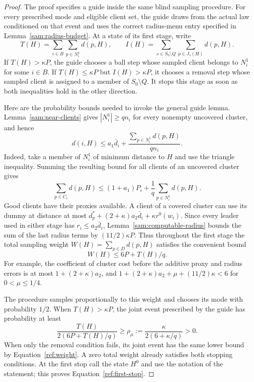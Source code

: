 \begin{proof}
The proof specifies a guide inside the same blind sampling procedure.
For every prescribed mode and eligible client set, the guide draws from
the actual law conditioned on that event and uses the correct radius-menu
entry specified in Lemma~\ref{sam:radius-budget}.
At a state of its first stage, write
\[
 T(H)=\sum_{i\in B}\sum_{p\in N_i^1}d(p,H),\qquad
 I(H)=\sum_{s\in S_0\setminus Q}\sum_{p\in J_s(H)}d(p,H).
\]
If $T(H)>\kappa P$, the guide chooses a ball step whose sampled client belongs
to $N_i^1$ for some $i\in B$.  If $T(H)\le\kappa P$ but
$I(H)>\kappa P$, it chooses a removal step whose sampled client is assigned
to a member of $S_0\setminus Q$.  It stops this stage as soon as both
inequalities hold in the other direction.

Here are the probability bounds needed to invoke the general guide lemma.
Lemma~\ref{sam:near-clients} gives $|N_i^1|\ge qn_i$ for every nonempty
uncovered cluster, and hence
\begin{equation}\label{ref:near-bound}
 d(i,H)\le a_1\bar d_i+
       \frac{\sum_{p\in N_i^1}d(p,H)}{qn_i}.
\end{equation}
Indeed, take a member of $N_i^1$ of minimum distance to $H$ and use the
triangle inequality.  Summing the resulting bound for all clients of an
uncovered cluster gives
\[
 \sum_{p\in C_i}d(p,H)
 \le(1+a_1)P_i+\frac1q\sum_{p\in N_i^1}d(p,H).
\]
Good clients have their proxies available.  A client of a covered cluster can
use its dummy at distance at most
$d_p^*+(2+\kappa)a_2\bar d_i+\kappa r^0(w_i)$.
Since every leader used in either stage has $r_i\le a_2\bar d_i$,
Lemma~\ref{sam:computable-radius} bounds the sum of the last radius terms by
$(11/2)\kappa P$.  Thus throughout the first stage the total sampling weight
$W(H)=\sum_{p\in D}d(p,H)$ satisfies the convenient bound
\begin{equation}\label{ref:weight}
 W(H)\le 6P+T(H)/q.
\end{equation}
For example, the coefficient of cluster cost before the additive proxy and
radius errors is at most $1+(2+\kappa)a_2$, and
$1+(2+\kappa)a_2+\mu+(11/2)\kappa<6$ for
$0<\mu\le1/4$.

The procedure samples proportionally to this weight and chooses its mode
with probability $1/2$.  When $T(H)>\kappa P$, the joint event prescribed by
the guide has probability at least
\[
 \frac{T(H)}{2(6P+T(H)/q)}
 \ge \rho_\mu:=\frac{\kappa}{2(6+\kappa/q)}>0.
\]
When only the removal condition fails, its joint event has the same lower
bound by Equation~\eqref{ref:weight}.  A zero total weight already satisfies both
stopping conditions.  At the first stop call the state $H^0$ and use the
notation of the statement; this proves Equation~\eqref{ref:first-stop}.


\end{proof}
